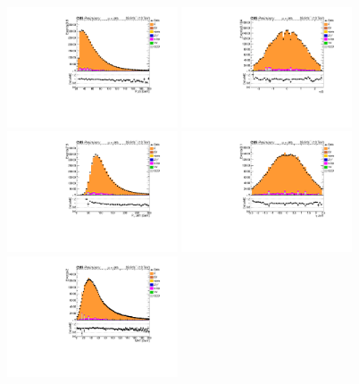 \begin{figure}
  \centering
  \includegraphics[width=0.45\textwidth]{fig/app4/muon/Pt_lep.pdf}
  \includegraphics[width=0.45\textwidth]{fig/app4/muon/Eta_lep.pdf} \\
  \includegraphics[width=0.45\textwidth]{fig/app4/muon/PtJet1.pdf}
  \includegraphics[width=0.45\textwidth]{fig/app4/muon/EtaJet1.pdf}
  \includegraphics[width=0.45\textwidth]{fig/app4/muon/MET_E.pdf}

\end{figure}
